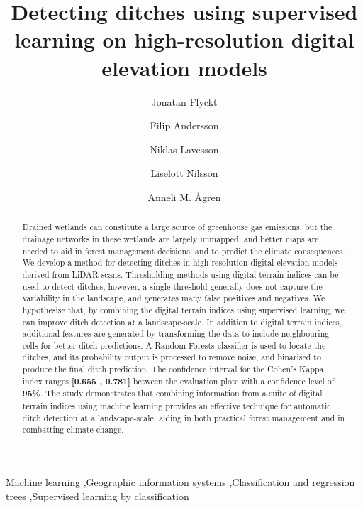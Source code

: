 \documentclass[11pt, review]{elsarticle} %
\begin{document}
\begin{frontmatter}
\title{Detecting ditches using supervised learning on high-resolution digital elevation models}

\author[ju]{Jonatan Flyckt}

\author[ju]{Filip Andersson}

\author[ju]{Niklas Lavesson}

\author[fa]{Liselott Nilsson}

\author[slu]{Anneli M. \AA gren}

\address[ju]{J\"onk\"oping Artificial Intelligence Laboratory, J\"onk\"oping University, Gjuterigatan 5, 551 11, J\"onk\"oping, Sweden}
\address[fa]{Forest Department, Swedish Forest Agency, Skeppargatan 17, 931 32 Skellefte\aa, Sweden}
\address[slu]{Department of Forest Ecology and Management, Swedish University of Agricultural Sciences, SLU, Skogsmarksgr\"and 17, 901 83, Ume\aa, Sweden}

\begin{abstract}
{\footnotesize
Drained wetlands can constitute a large source of greenhouse gas emissions, but the drainage networks in these wetlands are largely unmapped, and better maps are needed to aid in forest management decisions, and to predict the climate consequences. We develop a method for detecting ditches in high resolution digital elevation models derived from LiDAR scans. Thresholding methods using digital terrain indices can be used to detect ditches, however, a single threshold generally does not capture the variability in the landscape, and generates many false positives and negatives. We hypothesise that, by combining the digital terrain indices using supervised learning, we can improve ditch detection at a landscape-scale. In addition to digital terrain indices, additional features are generated by transforming the data to include neighbouring cells for better ditch predictions. A Random Forests classifier is used to locate the ditches, and its probability output is processed to remove noise, and binarised to produce the final ditch prediction. The confidence interval for the Cohen's Kappa index ranges \textbf{[0.655 , 0.781]} between the evaluation plots with a confidence level of \textbf{95\%}. The study demonstrates that combining information from  a suite of digital terrain indices using machine learning provides an effective technique for automatic ditch detection at a landscape-scale, aiding in both practical forest management and in combatting climate change.}
\end{abstract}

\begin{keyword}
{\footnotesize
Machine learning \sep Geographic information systems \sep Classification and regression trees \sep Supervised learning by classification}
\end{keyword}

\end{frontmatter}
\end{document}
